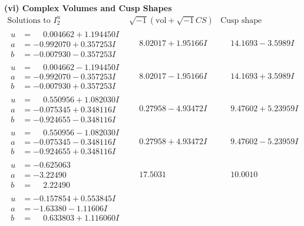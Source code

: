 \documentclass[1p]{elsarticle_modified}
\theoremstyle{definition}
\newcommand{\I}{\sqrt{-1}}
\begin{document}
\newpage\flushleft \textbf{(vi) Complex Volumes and Cusp Shapes}
$$\begin{array}{c|c|c}  
\text{Solutions to }I^u_{2}& \I (\text{vol} + \sqrt{-1}CS) & \text{Cusp shape}\\
 \hline 
\begin{aligned}
u &= \phantom{-}0.004662 + 1.194450 I \\
a &= -0.992070 + 0.357253 I \\
b &= -0.007930 - 0.357253 I\end{aligned}
 & \phantom{-}8.02017 + 1.95166 I & \phantom{-}14.1693 - 3.5989 I \\ \hline\begin{aligned}
u &= \phantom{-}0.004662 - 1.194450 I \\
a &= -0.992070 - 0.357253 I \\
b &= -0.007930 + 0.357253 I\end{aligned}
 & \phantom{-}8.02017 - 1.95166 I & \phantom{-}14.1693 + 3.5989 I \\ \hline\begin{aligned}
u &= \phantom{-}0.550956 + 1.082030 I \\
a &= -0.075345 + 0.348116 I \\
b &= -0.924655 - 0.348116 I\end{aligned}
 & \phantom{-}0.27958 - 4.93472 I & \phantom{-}9.47602 + 5.23959 I \\ \hline\begin{aligned}
u &= \phantom{-}0.550956 - 1.082030 I \\
a &= -0.075345 - 0.348116 I \\
b &= -0.924655 + 0.348116 I\end{aligned}
 & \phantom{-}0.27958 + 4.93472 I & \phantom{-}9.47602 - 5.23959 I \\ \hline\begin{aligned}
u &= -0.625063\phantom{ +0.000000I} \\
a &= -3.22490\phantom{ +0.000000I} \\
b &= \phantom{-}2.22490\phantom{ +0.000000I}\end{aligned}
 & \phantom{-}17.5031\phantom{ +0.000000I} & \phantom{-}10.0010\phantom{ +0.000000I} \\ \hline\begin{aligned}
u &= -0.157854 + 0.553845 I \\
a &= -1.63380 - 1.11606 I \\
b &= \phantom{-}0.633803 + 1.116060 I\end{aligned}

\end{array}$$
\end{document}
